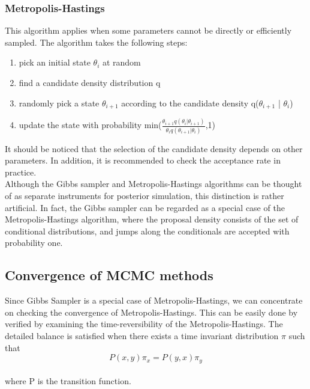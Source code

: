 \documentclass[letterpaper]{article}
\begin{document}
\subsubsection{Metropolis-Hastings}

This algorithm applies when some parameters cannot be directly or efficiently sampled. The algorithm takes the following steps:
\begin{enumerate}
\item pick an initial state $\theta_{i}$ at random
\item find a candidate density distribution q
\item randomly pick a state $\theta_{i+1}$ according to the candidate density q($\theta_{i+1}$ | $\theta_{i}$)
\item update the state with probability min($\frac{\theta_{i+1}q(\theta_{i}|\theta_{i+1})}{\theta_{i}q(\theta_{i+1}|\theta_{i})}$,1)
\end{enumerate}
It should be noticed that the selection of the candidate density depends on other parameters. In addition, it is recommended to check the acceptance rate in practice. \\

Although the Gibbs sampler and Metropolis-Hastings algorithms can be thought of as separate instruments for posterior
simulation, this distinction is rather artificial. In fact, the Gibbs sampler can be regarded as a special case of
the Metropolis-Hastings algorithm, where the proposal density consists of the set of conditional distributions, and jumps along the
conditionals are accepted with probability one.

\subsection{Convergence of MCMC methods}
Since Gibbs Sampler is a special case of Metropolis-Hastings, we can concentrate on checking the convergence of Metropolis-Hastings. This can be easily done by verified by examining the time-reversibility of the Metropolis-Hastings. The detailed balance is satisfied when there exists a time invariant distribution $\pi$ such that 
\begin{equation}
P(x,y)\pi_{x}=P(y,x)\pi_{y}
\end{equation} \\
where P is the transition function.\\
\end{document}
